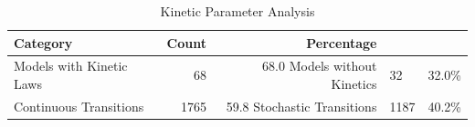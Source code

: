 \begin{table}[htbp]
\centering
\caption{Kinetic Parameter Analysis}
\label{tab:kinetics-stats}
\begin{tabular}{lrr}
\toprule
\textbf{Category} & \textbf{Count} & \textbf{Percentage} \\
\midrule
Models with Kinetic Laws & 68 & 68.0%
Models without Kinetics & 32 & 32.0\% \\
\midrule
Continuous Transitions & 1765 & 59.8%
Stochastic Transitions & 1187 & 40.2\% \\
\bottomrule
\end{tabular}
\end{table}
